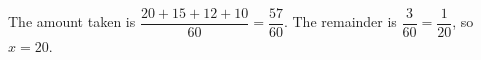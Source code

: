 The amount taken is $\dfrac{20+15+12+10}{60}=\dfrac{57}{60}$. The remainder is $\dfrac{3}{60}=\dfrac{1}{20}$, so $\boxed{x=20}$.
